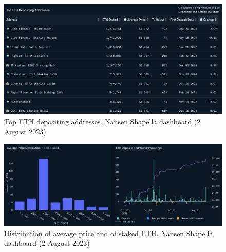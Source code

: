 \documentclass[UTF8]{article}
\begin{document}
\begin{figure}[htbp]
\begin{center}
\includegraphics[width=0.8\linewidth]{images/nansen7}
\caption{Top ETH depositing addresses. Nansen Shapella dashboard (2 August 2023)}
\label{fig:nansen7}
\end{center}
\end{figure}

\begin{figure}[htbp]
\begin{center}
\includegraphics[width=\linewidth]{images/nansen9}
\caption{Distribution of average price and of staked ETH. Nansen Shapella dashboard (2 August 2023)}
\label{fig:nansen9}
\end{center}
\end{figure}
\end{document}
